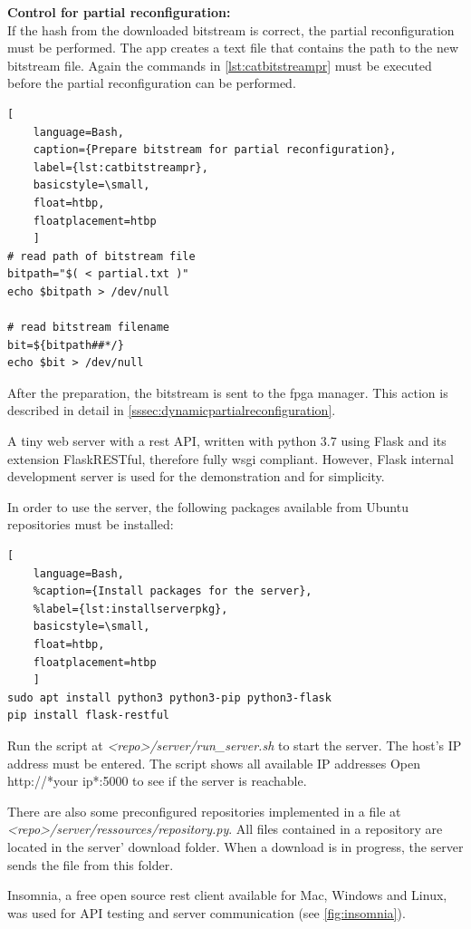\textbf{Control for partial reconfiguration:}\\
If the hash from the downloaded bitstream is correct, the partial reconfiguration must be performed. The app creates a text file that contains the path to the new bitstream file. Again the commands in \cref{lst:catbitstreampr} must be executed before the partial reconfiguration can be performed. 
\begin{lstlisting}[
	language=Bash,
	caption={Prepare bitstream for partial reconfiguration},
	label={lst:catbitstreampr},
	basicstyle=\small,
	float=htbp,
	floatplacement=htbp
	]
# read path of bitstream file 
bitpath="$( < partial.txt )"
echo $bitpath > /dev/null

# read bitstream filename
bit=${bitpath##*/}
echo $bit > /dev/null
\end{lstlisting}

After the preparation, the bitstream is sent to the \gls{fpga} manager. This action is described in detail in \cref{sssec:dynamicpartialreconfiguration}.

\label{ssssec:server}
A tiny web server with a \gls{rest} API, 
written with python $3.7$ using Flask and its extension FlaskRESTful, therefore fully \gls{wsgi} compliant. However, Flask internal development server is used for the demonstration and for simplicity.

In order to use the server, the following packages available from Ubuntu repositories must be installed: 
\begin{lstlisting}[
	language=Bash,
	%caption={Install packages for the server},
	%label={lst:installserverpkg},
	basicstyle=\small,
	float=htbp,
	floatplacement=htbp
	]
sudo apt install python3 python3-pip python3-flask
pip install flask-restful 
\end{lstlisting}

Run the script at \emph{<repo>/server/run\_server.sh} to start the server. The host's IP address must be entered. The script shows all available IP addresses
Open http://*your ip*:5000 to see if the server is reachable.

There are also some preconfigured repositories implemented in a file at \emph{<repo>/server/ressources/repository.py}.
All files contained in a repository are located in the server' download folder. When a download is in progress, the server sends the file from this folder.

\label{ssssec:serverapi}
Insomnia, a free open source \gls{rest} client available for Mac, Windows and Linux, was used for API testing and server communication (see \cref{fig:insomnia}).

